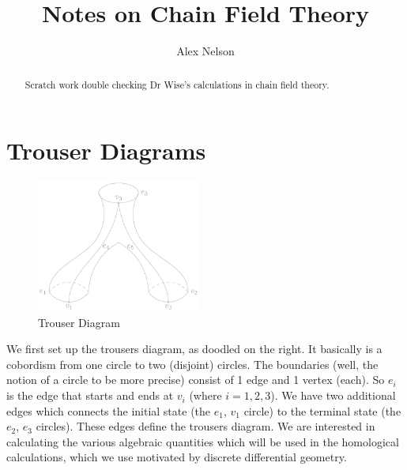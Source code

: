 \documentclass[draft]{amsart}
\title{Notes on Chain Field Theory}
\author{Alex Nelson}
\numberwithin{equation}{section}
\begin{document}
\maketitle
\begin{abstract}
Scratch work double checking Dr Wise's calculations in chain
field theory.
\end{abstract}

\section{Trouser Diagrams}

\begin{figure}
  \begin{center}
    \includegraphics[width=0.48\textwidth]{img/img0.eps}
  \end{center}
  \caption{\footnotesize {Trouser Diagram}}
\end{figure}
We first set up the trousers diagram, as doodled on the right. It
basically is a cobordism from one circle to two (disjoint)
circles. The boundaries (well, the notion of a circle to be more
precise) consist of 1 edge and 1 vertex (each). So $e_{i}$ is the
edge that starts and ends at $v_{i}$ (where $i=1,2,3$). We have
two additional edges which connects the initial state (the
$e_{1}$, $v_{1}$ circle) to the terminal state (the $e_{2}$,
$e_{3}$ circles). These edges define the trousers diagram. We are
interested in calculating the various algebraic quantities which
will be used in the homological calculations, which we use
motivated by discrete differential geometry.
\end{document}
